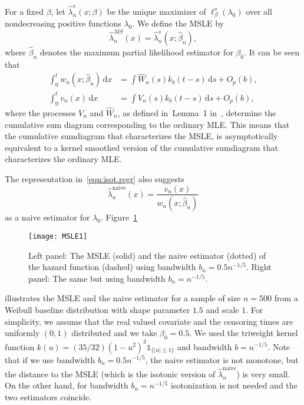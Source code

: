 \documentclass[11pt,reqno]{amsart}
\theoremstyle{definition}
\theoremstyle{plain}
\theoremstyle{remark}
\begin{document}
For a fixed $\beta$, let $\hat{\lambda}^s_n(x;\beta)$ be the unique maximizer of $\ell^s_\beta(\lambda_0)$ over all nondecreasing positive functions $\lambda_0$.
We define the MSLE by
\begin{equation}
\label{def:lambdaMS}
\hat{\lambda}^{MS}_n(x)=\hat{\lambda}^s_n(x;\hat{\beta}_n),
\end{equation}
where $\hat{\beta}_n$ denotes the maximum partial likelihood estimator for $\beta_0$.
It can be seen that
\[
\begin{split}
\int_0^t w_n(x;\hat\beta_n)\,\mathrm{d}x
&=
\int
\hat W_n(s)k_b(t-s)\,\mathrm{d}s+O_p(b),\\
\int_0^t v_n(x)\,\mathrm{d}x
&=
\int V_n(s)k_b(t-s)\,\mathrm{d}s+O_p(b),
\end{split}
\]
where the processes $V_n$ and $\hat W_n$, as defined in~Lemma~1 in~\cite{LopuhaaNane2013}, determine the cumulative sum diagram corresponding
to the ordinary MLE.
This means that the cumulative sumdiagram that characterizes the MSLE,
is asymptotically equivalent to a kernel smoothed version of the cumulative sumdiagram that characterizes the ordinary MLE.

The representation in~\eqref{eqn:isot.regr} also suggests
\begin{equation}
\label{def:naive est MSLE}
\hat{\lambda}_n^{\mathrm{naive}}(x)=\frac{v_n(x)}{w_n(x;\hat{\beta}_n)}
\end{equation}
as a naive estimator for $\lambda_0$.
Figure~\ref{fig:MSLE}
\begin{figure}[t]
\texttt{[image: MSLE1]}
\caption{Left panel: The MSLE (solid) and the naive estimator (dotted) of the hazard function (dashed) using bandwidth $b_n=0.5n^{-1/5}$.
Right panel: The same but using bandwidth $b_n=n^{-1/5}$.}
\label{fig:MSLE}
\end{figure}
illustrates the MSLE and the naive estimator for
a sample of size $n=500$ from a Weibull baseline distribution with shape parameter $1.5$ and scale $1$.
For simplicity, we assume that the real valued covariate and the censoring times are uniformly $(0,1)$ distributed and we take $\beta_0=0.5$.
We used the triweight kernel function
$k(u)=(35/32)(1-u^2)^3{\mathds{1}}_{\{|u|\leq 1\}}$
and bandwidth $b=n^{-1/5}$.
Note that if we use bandwidth $b_n=0.5n^{-1/5}$, the naive estimator is not monotone,
but the distance to the MSLE (which is the isotonic version of $\hat{\lambda}^{\mathrm{naive}}_n$) is very small.
On the other hand, for bandwidth $b_n=n^{-1/5}$ isotonization is not needed and the two estimators coincide.
\end{document}
